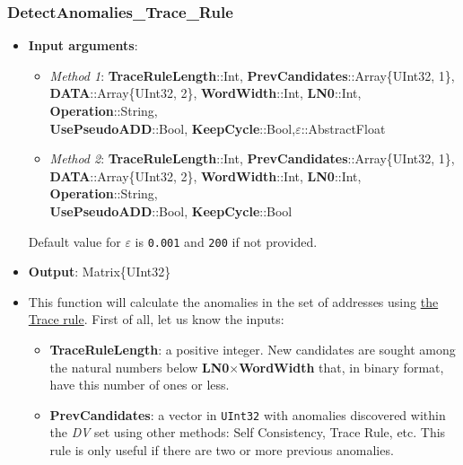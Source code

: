  \subsubsection*{DetectAnomalies\_Trace\_Rule}\label{Fun:DetectAnomaliesTraceRule}
 \begin{itemize}
	 \item \textbf{Input arguments}: 
	 \begin{itemize}
	 	\item \textit{Method 1}: \textbf{TraceRuleLength}::Int, 
	 	\textbf{PrevCandidates}::Array\{UInt32, 1\}, \\ \textbf{DATA}::Array\{UInt32, 2\}, \textbf{WordWidth}::Int, \textbf{LN0}::Int,  \textbf{Operation}::String, \\ \textbf{UsePseudoADD}::Bool, \textbf{KeepCycle}::Bool,\textbf{\(\varepsilon\)}::AbstractFloat
	 	\item \textit{Method 2}: \textbf{TraceRuleLength}::Int,
	 	\textbf{PrevCandidates}::Array\{UInt32, 1\}, \\ \textbf{DATA}::Array\{UInt32, 2\}, \textbf{WordWidth}::Int, \textbf{LN0}::Int,  \textbf{Operation}::String, \\ \textbf{UsePseudoADD}::Bool, \textbf{KeepCycle}::Bool
	 \end{itemize}
	 Default value for \textbf{\(\varepsilon\)} is \texttt{0.001} and \texttt{200} if  not provided.
	 \item \textbf{Output}: Matrix\{UInt32\}
	 \item This function will calculate the anomalies in the set of addresses using \hyperref[Subsec:TraceRule]{the Trace rule}. 
	 First of all, let us know the inputs:
	 \begin{itemize}
	 	\item \textbf{TraceRuleLength}: a positive integer. New candidates are sought among the natural numbers below \textbf{LN0}\(\times\)\textbf{WordWidth} that, in binary format, have this number of ones or less.
	 	
	 	\item \textbf{PrevCandidates}: a vector in \texttt{UInt32} with anomalies discovered within the \textit{DV} set using other methods: Self Consistency, Trace Rule, etc. This rule is only useful if there are two or more previous anomalies. 
	 	

\end{itemize}
\end{itemize}
